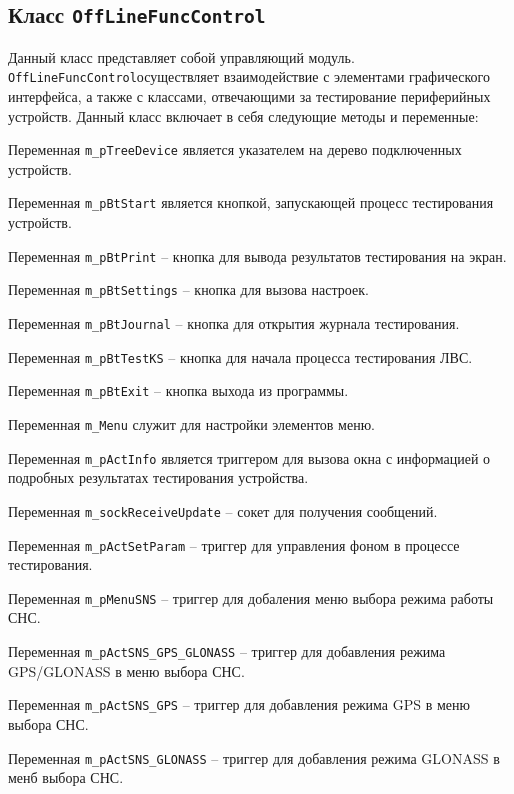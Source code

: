\subsection{Класс \texttt{OffLineFuncControl}}
Данный класс представляет собой управляющий модуль. \texttt{OffLineFuncControl}осуществляет взаимодействие с элементами графического
интерфейса, а также с классами, отвечающими за тестирование периферийных устройств.
Данный класс включает в себя следующие методы и переменные:
\begin{enum}
	\item Переменная \texttt{m\_pTreeDevice} является указателем на дерево подключенных устройств.
	\item Переменная \texttt{m\_pBtStart} является кнопкой, запускающей процесс тестирования устройств.
	\item Переменная \texttt{m\_pBtPrint} -- кнопка для вывода результатов тестирования на экран.
	\item Переменная \texttt{m\_pBtSettings} -- кнопка для вызова настроек.
	\item Переменная \texttt{m\_pBtJournal} -- кнопка для открытия журнала тестирования.
	\item Переменная \texttt{m\_pBtTestKS} -- кнопка для начала процесса тестирования ЛВС.
	\item Переменная \texttt{m\_pBtExit} -- кнопка выхода из программы.

	\item Переменная \texttt{m\_Menu} служит для настройки элементов меню.
	\item Переменная \texttt{m\_pActInfo} является триггером для вызова окна с информацией о подробных результатах
		тестирования устройства.

	\item Переменная \texttt{m\_sockReceiveUpdate} -- сокет для получения сообщений.

	\item Переменная \texttt{m\_pActSetParam} -- триггер для управления фоном в процессе тестирования.
	\item Переменная \texttt{m\_pMenuSNS} -- триггер для добаления меню выбора режима работы СНС.
	\item Переменная \texttt{m\_pActSNS\_GPS\_GLONASS} -- триггер для добавления режима GPS/GLONASS в меню выбора
		СНС.
	\item Переменная \texttt{m\_pActSNS\_GPS} -- триггер для добавления режима GPS в меню выбора СНС.
	\item Переменная \texttt{m\_pActSNS\_GLONASS} -- триггер для добавления режима GLONASS в менб выбора СНС.


\end{enum}
